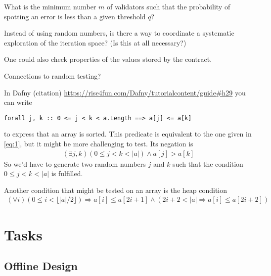 \documentclass{article}
\begin{document}
What is the minimum number $m$ of validators such that the probability of spotting an
error is less than a given threshold $q$?

Instead of using random numbers, is there a way to coordinate a systematic exploration
of the iteration space? (Is this at all necessary?)

One could also check properties of the values stored by the contract.

Connections to random testing?

In Dafny (citation) \url{https://rise4fun.com/Dafny/tutorialcontent/guide#h29} you can
write
\begin{lstlisting}
forall j, k :: 0 <= j < k < a.Length ==> a[j] <= a[k]
\end{lstlisting}
to express that an array is sorted. This predicate is equivalent to the one given in
\eqref{eq:1}, but it might be more challenging to test. Its negation is
\begin{gather}
  \label{eq:2}
  (\exists j, k ) (0\le j< k < |a|) \wedge a[j] > a[k]
\end{gather}
So we'd have to generate two random numbers $j$ and $k$ such that the condition $0 \le
j < k < |a|$ is fulfilled.


Another condition that might be tested on an array is the heap condition
\begin{gather}
  \label{eq:3}
  (\forall i) (0 \le i < \lfloor|a|/2\rfloor) \Rightarrow a[i] \le a[2i+1] \wedge (2i+2
  < |a| \Rightarrow a[i] \le a[2i+2])
\end{gather}

\section{Tasks}
\label{sec:tasks}

\subsection{Offline Design}
\label{sec:offline-design}
\end{document}
